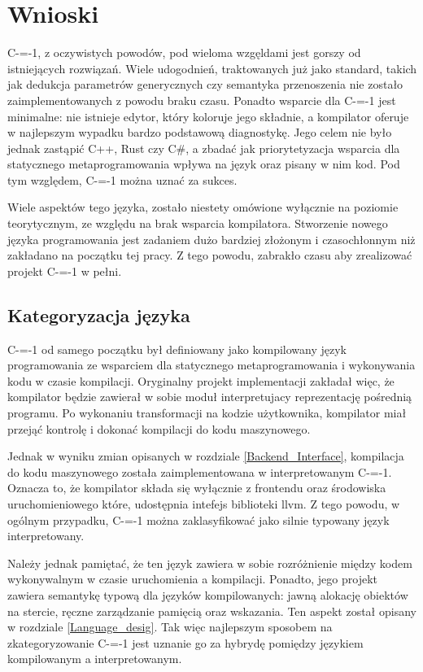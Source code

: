\section{Wnioski}

C-=-1, z oczywistych powodów, pod wieloma wzgęldami jest gorszy od istniejących rozwiązań.
Wiele udogodnień, traktowanych już jako standard, takich jak dedukcja parametrów generycznych czy semantyka przenoszenia nie zostało zaimplementowanych z powodu braku czasu.
Ponadto wsparcie dla C-=-1 jest minimalne: nie istnieje edytor, który koloruje jego składnie, a kompilator oferuje w najlepszym wypadku bardzo podstawową diagnostykę.
Jego celem nie było jednak zastąpić C++, Rust czy C\#, a zbadać jak priorytetyzacja wsparcia dla statycznego metaprogramowania wpływa na język oraz pisany w nim kod. 
Pod tym względem, C-=-1 można uznać za sukces.

Wiele aspektów tego języka, zostało niestety omówione wyłącznie na poziomie teorytycznym, ze względu na brak wsparcia kompilatora.
Stworzenie nowego języka programowania jest zadaniem dużo bardziej złożonym i czasochłonnym niż zakładano na początku tej pracy.
Z tego powodu, zabrakło czasu aby zrealizować projekt C-=-1 w pełni.


\subsection{Kategoryzacja języka}

C-=-1 od samego początku był definiowany jako kompilowany język programowania ze wsparciem dla statycznego metaprogramowania i wykonywania kodu w czasie kompilacji.
Oryginalny projekt implementacji zakładał więc, że kompilator będzie zawierał w sobie moduł interpretujacy reprezentację pośrednią programu.
Po wykonaniu transformacji na kodzie użytkownika, kompilator miał przejąć kontrolę i dokonać kompilacji do kodu maszynowego.

Jednak w wyniku zmian opisanych w rozdziale \ref{Backend_Interface}, kompilacja do kodu maszynowego została zaimplementowana w interpretowanym C-=-1.
Oznacza to, że kompilator składa się wyłącznie z frontendu oraz środowiska uruchomieniowego które, udostępnia intefejs biblioteki llvm.
Z tego powodu, w ogólnym przypadku, C-=-1 można zaklasyfikować jako silnie typowany język interpretowany.

Należy jednak pamiętać, że ten język zawiera w sobie rozróżnienie między kodem wykonywalnym w czasie uruchomienia a kompilacji.
Ponadto, jego projekt zawiera semantykę typową dla języków kompilowanych: jawną alokację obiektów na stercie, ręczne zarządzanie pamięcią oraz wskazania. 
Ten aspekt został opisany w rozdziale \ref{Language_desig}.
Tak więc najlepszym sposobem na zkategoryzowanie C-=-1 jest uznanie go za hybrydę pomiędzy językiem kompilowanym a interpretowanym.


